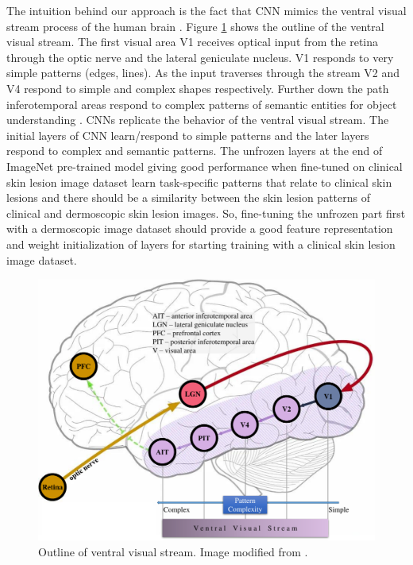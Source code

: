 The intuition behind our approach is the fact that CNN mimics the ventral visual stream process of the human brain \cite{Zhuang2021}. Figure \ref{fig:ventral-stream} shows the outline of the ventral visual stream. The first visual area V1 receives optical input from the retina through the optic nerve and the lateral geniculate nucleus. V1 responds to very simple patterns (edges, lines). As the input traverses through the stream V2 and V4 respond to simple and complex shapes respectively. Further down the path inferotemporal areas respond to complex patterns of semantic entities for object understanding \cite{Qin2018}. CNNs replicate the behavior of the ventral visual stream. The initial layers of CNN learn/respond to simple patterns and the later layers respond to complex and semantic patterns. The unfrozen layers at the end of ImageNet pre-trained model giving good performance when fine-tuned on clinical skin lesion image dataset learn task-specific patterns that relate to clinical skin lesions and there should be a similarity between the skin lesion patterns of clinical and dermoscopic skin lesion images. So, fine-tuning the unfrozen part first with a dermoscopic image dataset should provide a good feature representation and weight initialization of layers for starting training with a clinical skin lesion image dataset.    
\begin{figure}[htb!]
	\centering
	\includegraphics[width=\textwidth,keepaspectratio]{images/pretraining/ventral-stream-cropped.pdf}
	\caption[Outline of ventral visual stream]{Outline of ventral visual stream. Image modified from \cite{ventral-system}.}
	\label{fig:ventral-stream}
\end{figure}

